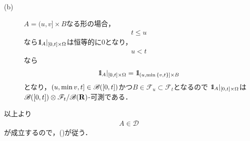\begin{sketch}
\begin{description}
			\item[(b)]
				$A = (u,v] \times B$なる形の場合，
				\begin{align}
					t \leq u
				\end{align}
				なら$\mbox{1}\hspace{-0.25em}\mbox{l}_A|_{[0,t] \times \Omega}$は恒等的に$0$となり，
				\begin{align}
					u < t
				\end{align}
				なら
				\begin{align}
					\mbox{1}\hspace{-0.25em}\mbox{l}_A|_{[0,t] \times \Omega} = \mbox{1}\hspace{-0.25em}\mbox{l}_{(u,\min{\{v,t\}}] \times B}
				\end{align}
				となり，$(u,\min{v,t}] \in \mathscr{B}([0,t])$かつ$B \in \mathscr{F}_u \subset \mathscr{F}_t$となるので
				$\mbox{1}\hspace{-0.25em}\mbox{l}_A|_{[0,t] \times \Omega}$は$\mathscr{B}([0,t]) \otimes \mathscr{F}_t/\mathscr{B}(\mathbf{R})$-可測である．
		\end{description}
		以上より
		\begin{align}
			A \in \mathscr{D}
		\end{align}
		が成立するので，()が従う．
		\QED
	\end{sketch}